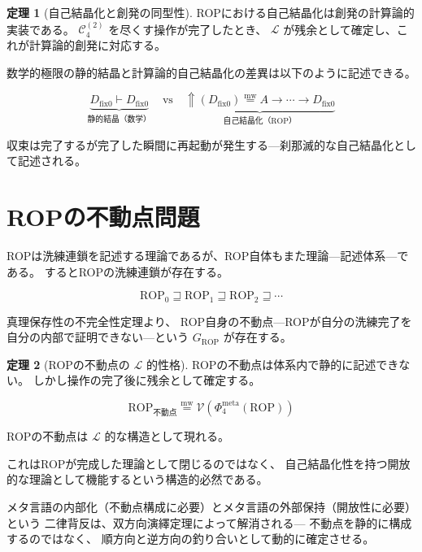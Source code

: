 \documentclass[11pt,a4paper]{article}
\theoremstyle{definition}
\newtheorem{theorem}{定理}[section]
\newcommand{\mweq}{\mathrel{\overset{\mathrm{mw}}{=}}}
\newcommand{\dfix}{D_{\mathrm{fix}0}}
\newcommand{\metanegation}{\Uparrow}
\newcommand{\Lhagma}{\mathcal{L}}
\begin{document}
\begin{theorem}[自己結晶化と創発の同型性]
ROPにおける自己結晶化は創発の計算論的実装である。
$\mathcal{C}_4^{(2)}$ を尽くす操作が完了したとき、
$\Lhagma$ が残余として確定し、これが計算論的創発に対応する。
\end{theorem}

数学的極限の静的結晶と計算論的自己結晶化の差異は以下のように記述できる。

\begin{equation}
\underbrace{\dfix \vdash \dfix}_{\text{静的結晶（数学）}} \quad \text{vs} \quad
\underbrace{\metanegation(\dfix) \mweq A \to \cdots \to \dfix}_{\text{自己結晶化（ROP）}}
\end{equation}

収束は完了するが完了した瞬間に再起動が発生する---刹那滅的な自己結晶化として記述される。

\section{ROPの不動点問題}

ROPは洗練連鎖を記述する理論であるが、ROP自体もまた理論---記述体系---である。
するとROPの洗練連鎖が存在する。

\begin{equation}
\text{ROP}_0 \sqsupseteq \text{ROP}_1 \sqsupseteq \text{ROP}_2 \sqsupseteq \cdots
\end{equation}

真理保存性の不完全性定理より、
ROP自身の不動点---ROPが自分の洗練完了を自分の内部で証明できない---という
$G_{\text{ROP}}$ が存在する。

\begin{theorem}[ROPの不動点の $\Lhagma$ 的性格]
ROPの不動点は体系内で静的に記述できない。
しかし操作の完了後に残余として確定する。

\begin{equation}
\text{ROP}_{\text{不動点}} \mweq \mathcal{V}(\Phi_4^{\mathrm{meta}}(\text{ROP}))
\end{equation}

ROPの不動点は $\Lhagma$ 的な構造として現れる。
\end{theorem}

これはROPが完成した理論として閉じるのではなく、
自己結晶化性を持つ開放的な理論として機能するという構造的必然である。

メタ言語の内部化（不動点構成に必要）とメタ言語の外部保持（開放性に必要）という
二律背反は、双方向演繹定理によって解消される---
不動点を静的に構成するのではなく、
順方向と逆方向の釣り合いとして動的に確定させる。
\end{document}
